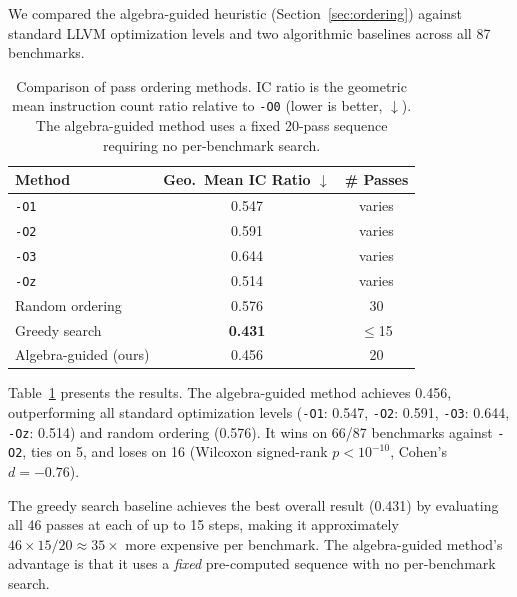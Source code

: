 \documentclass[11pt]{article}
\begin{document}
We compared the algebra-guided heuristic (Section~\ref{sec:ordering}) against standard LLVM optimization levels and two algorithmic baselines across all 87 benchmarks.

\begin{table}[t]
\centering
\caption{Comparison of pass ordering methods. IC ratio is the geometric mean instruction count ratio relative to \texttt{-O0} (lower is better, $\downarrow$). The algebra-guided method uses a fixed 20-pass sequence requiring no per-benchmark search.}
\label{tab:ordering}
\begin{tabular}{lcc}
\toprule
\textbf{Method} & \textbf{Geo.\ Mean IC Ratio} $\downarrow$ & \textbf{\# Passes} \\
\midrule
\texttt{-O1} & 0.547 & varies \\
\texttt{-O2} & 0.591 & varies \\
\texttt{-O3} & 0.644 & varies \\
\texttt{-Oz} & 0.514 & varies \\
Random ordering & 0.576 & 30 \\
Greedy search & \textbf{0.431} & $\leq$15 \\
\midrule
Algebra-guided (ours) & 0.456 & 20 \\
\bottomrule
\end{tabular}
\end{table}

Table~\ref{tab:ordering} presents the results. The algebra-guided method achieves 0.456, outperforming all standard optimization levels (\texttt{-O1}: 0.547, \texttt{-O2}: 0.591, \texttt{-O3}: 0.644, \texttt{-Oz}: 0.514) and random ordering (0.576). It wins on 66/87 benchmarks against \texttt{-O2}, ties on 5, and loses on 16 (Wilcoxon signed-rank $p < 10^{-10}$, Cohen's $d = -0.76$).

The greedy search baseline achieves the best overall result (0.431) by evaluating all 46 passes at each of up to 15 steps, making it approximately $46 \times 15 / 20 \approx 35\times$ more expensive per benchmark. The algebra-guided method's advantage is that it uses a \emph{fixed} pre-computed sequence with no per-benchmark search.
\end{document}
